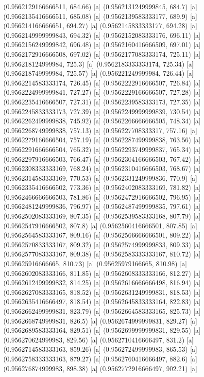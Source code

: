 {{{(0.9562129166666511, 684.66) [a] 
(0.9562131249999845, 684.7) [a] 
(0.9562135416666511, 685.08) [a] 
(0.9562139583333177, 689.9) [a] 
(0.956214166666651, 694.27) [a] 
(0.9562145833333177, 694.28) [a] 
(0.9562149999999843, 694.32) [a] 
(0.9562152083333176, 696.11) [a] 
(0.9562156249999842, 696.48) [a] 
(0.9562160416666509, 697.01) [a] 
(0.9562172916666508, 697.02) [a] 
(0.9562177083333174, 725.11) [a] 
(0.956218124999984, 725.3) [a] 
(0.9562183333333174, 725.34) [a] 
(0.956218749999984, 725.57) [a] 
(0.956221249999984, 726.44) [a] 
(0.9562214583333174, 726.45) [a] 
(0.9562222916666507, 726.84) [a] 
(0.9562224999999841, 727.27) [a] 
(0.9562229166666507, 727.28) [a] 
(0.9562235416666507, 727.31) [a] 
(0.9562239583333173, 727.35) [a] 
(0.9562245833333173, 727.39) [a] 
(0.9562249999999839, 730.54) [a] 
(0.9562262499999838, 745.92) [a] 
(0.9562266666666505, 748.34) [a] 
(0.9562268749999838, 757.13) [a] 
(0.956227708333317, 757.16) [a] 
(0.9562279166666504, 757.19) [a] 
(0.9562287499999838, 763.56) [a] 
(0.9562291666666504, 765.32) [a] 
(0.9562293749999837, 765.34) [a] 
(0.9562297916666503, 766.47) [a] 
(0.9562304166666503, 767.42) [a] 
(0.9562308333333169, 768.24) [a] 
(0.9562310416666503, 768.67) [a] 
(0.9562314583333169, 770.53) [a] 
(0.9562331249999836, 770.9) [a] 
(0.9562335416666502, 773.36) [a] 
(0.9562402083333169, 781.82) [a] 
(0.9562466666666503, 781.86) [a] 
(0.9562472916666502, 796.95) [a] 
(0.9562481249999836, 796.97) [a] 
(0.9562487499999835, 797.61) [a] 
(0.9562502083333169, 807.35) [a] 
(0.9562539583333168, 807.79) [a] 
(0.9562547916666502, 807.8) [a] 
(0.9562560416666501, 807.85) [a] 
(0.9562564583333167, 809.16) [a] 
(0.9562566666666501, 809.22) [a] 
(0.9562570833333167, 809.32) [a] 
(0.9562574999999833, 809.33) [a] 
(0.9562577083333167, 809.38) [a] 
(0.9562583333333167, 810.72) [a] 
(0.95625916666665, 810.73) [a] 
(0.95625979166665, 810.98) [a] 
(0.9562602083333166, 811.85) [a] 
(0.9562608333333166, 812.27) [a] 
(0.9562612499999832, 814.25) [a] 
(0.9562616666666498, 816.94) [a] 
(0.9562627083333165, 818.52) [a] 
(0.9562631249999831, 818.53) [a] 
(0.9562635416666497, 818.54) [a] 
(0.9562645833333164, 822.83) [a] 
(0.9562662499999831, 823.79) [a] 
(0.9562664583333165, 825.73) [a] 
(0.9562668749999831, 826.5) [a] 
(0.9562674999999831, 829.27) [a] 
(0.9562689583333164, 829.51) [a] 
(0.9562699999999831, 829.55) [a] 
(0.956270624999983, 829.56) [a] 
(0.9562710416666497, 831.2) [a] 
(0.9562714583333163, 859.26) [a] 
(0.956272499999983, 865.53) [a] 
(0.9562758333333163, 879.27) [a] 
(0.9562760416666497, 882.6) [a] 
(0.956276874999983, 898.38) [a] 
(0.9562772916666497, 902.21) [a] 
}}}
